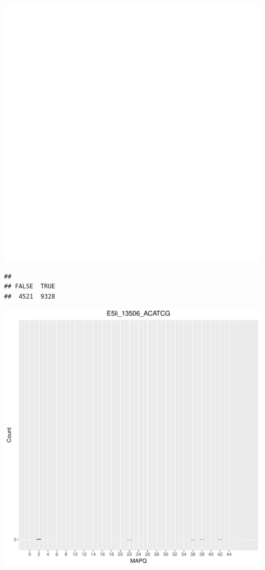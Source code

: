 \documentclass[12pt, a4paper]{article}\usepackage[]{graphicx}\usepackage[]{color}
\makeatletter
\def\maxwidth{ %
  \ifdim\Gin@nat@width>\linewidth
    \linewidth
  \else
    \Gin@nat@width
  \fi
}
\newenvironment{kframe}{%
 \def\at@end@of@kframe{}%
 \ifinner\ifhmode%
  \def\at@end@of@kframe{\end{minipage}}%
  \begin{minipage}{\columnwidth}%
 \fi\fi%
 \def\FrameCommand##1{\hskip\@totalleftmargin \hskip-\fboxsep
 \colorbox{shadecolor}{##1}\hskip-\fboxsep
     \hskip-\linewidth \hskip-\@totalleftmargin \hskip\columnwidth}%
 \MakeFramed {\advance\hsize-\width
   \@totalleftmargin\z@ \linewidth\hsize
   \@setminipage}}%
 {\par\unskip\endMakeFramed%
 \at@end@of@kframe}
\newenvironment{knitrout}{}{} %
\makeatother
\begin{document}
\begin{knitrout}
\includegraphics[width=\maxwidth]{figure/unnamed-chunk-3-26} 
\begin{kframe}\begin{verbatim}
## 
## FALSE  TRUE 
##  4521  9328
\end{verbatim}
\end{kframe}
\includegraphics[width=\maxwidth]{figure/unnamed-chunk-3-27} 


\end{knitrout}
\end{document}
